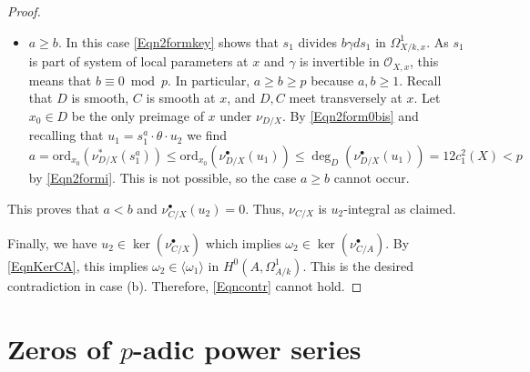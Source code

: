 \documentclass[11pt]{amsart}
\theoremstyle{remark}
\numberwithin{equation}{section}
\newcommand{\Ocal}{\mathscr{O}}
\newcommand{\ord}{\mathrm{ord}}
\begin{document}
\begin{proof}
\begin{itemize}
\item $a\ge b$. In this case \eqref{Eqn2formkey} shows that $s_1$ divides $b\gamma ds_1$ in $\Omega^1_{X/k,x}$. As $s_1$ is part of system of local parameters at $x$ and $\gamma$ is invertible in $\Ocal_{X,x}$, this means that $b\equiv 0\bmod p$. In particular, $a\ge b\ge p$ because $a,b\ge 1$. Recall that $D$ is smooth, $C$ is smooth at $x$, and $D,C$ meet transversely at $x$. Let $x_0\in D$ be the only preimage of $x$ under $\nu_{D/X}$. By \eqref{Eqn2form0bis} and recalling that $u_1=s_1^a\cdot \theta\cdot u_2$ we find
$$
a = \ord_{x_0}(\nu_{D/X}^*(s_1^a))\le \ord_{x_0}(\nu_{D/X}^\bullet (u_1))\le \deg_D(\nu_{D/X}^\bullet (u_1))= 12c_1^2(X)<p
$$
by \eqref{Eqn2formi}. This is not possible, so the case $a\ge b$ cannot occur.
\end{itemize}
This proves that $a<b$ and $\nu^\bullet_{C/X}(u_2)=0$. Thus, $\nu_{C/X}$ is $u_2$-integral as claimed.


Finally, we have $u_2\in \ker (\nu_{C/X}^\bullet)$ which implies $\omega_2\in \ker (\nu_{C/A}^\bullet)$. By \eqref{EqnKerCA}, this implies $\omega_2\in \langle \omega_1\rangle$ in $H^0(A,\Omega^1_{A/k})$. This is the desired contradiction in case (b). Therefore, \eqref{Eqncontr} cannot hold.
\end{proof}







\section{Zeros of $p$-adic power series} \label{SecZeros}
\end{document}
